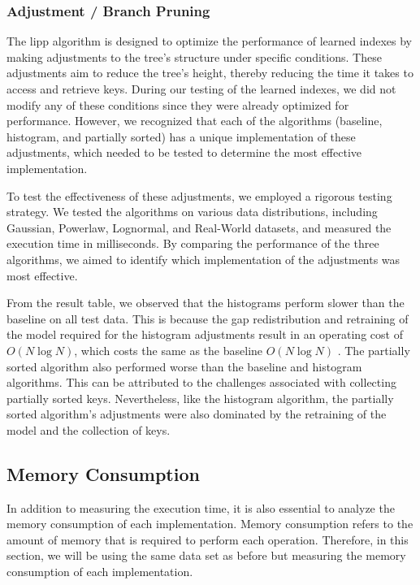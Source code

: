 \documentclass[11pt,a4paper]{article}
\begin{document}
\subsubsection{Adjustment / Branch Pruning}
The \acrfull{lipp} algorithm is designed to optimize the performance of learned indexes by making adjustments to the tree's structure under specific conditions. These adjustments aim to reduce the tree's height, thereby reducing the time it takes to access and retrieve keys. During our testing of the learned indexes, we did not modify any of these conditions since they were already optimized for performance. However, we recognized that each of the algorithms (baseline, histogram, and partially sorted) has a unique implementation of these adjustments, which needed to be tested to determine the most effective implementation.

To test the effectiveness of these adjustments, we employed a rigorous testing strategy. We tested the algorithms on various data distributions, including Gaussian, Powerlaw, Lognormal, and Real-World datasets, and measured the execution time in milliseconds. By comparing the performance of the three algorithms, we aimed to identify which implementation of the adjustments was most effective.

From the result table, we observed that the histograms perform slower than the baseline on all test data. This is because the gap redistribution and retraining of the model required for the histogram adjustments result in an operating cost of $O(N\log N)$, which costs the same as the baseline $O(N\log N)$ \cite{LIPP}. The partially sorted algorithm also performed worse than the baseline and histogram algorithms. This can be attributed to the challenges associated with collecting partially sorted keys. Nevertheless, like the histogram algorithm, the partially sorted algorithm's adjustments were also dominated by the retraining of the model and the collection of keys.



\subsection{Memory Consumption}
In addition to measuring the execution time, it is also essential to analyze the memory consumption of each implementation. Memory consumption refers to the amount of memory that is required to perform each operation. Therefore, in this section, we will be using the same data set as before but measuring the memory consumption of each implementation.
\end{document}
